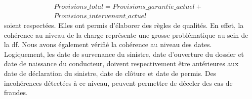  
\begin{equation}
\begin{split}  
 Provisions\_total = Provisions\_garantie\_actuel + \\
 Provisions\_intervenant\_actuel  
\end{split}
\end{equation}
soient respect\'ees. Elles ont permis d'\'elaborer des r\`egles de qualit\'es. En effet, la coh\'erence au niveau de la charge repr\'esente une grosse probl\'ematique au sein de la \acrshort{df}. Nous avons \'egalement v\'erifi\'e la coh\'erence au niveau des dates. Logiquement, les date de survenance du sinistre, date d'ouverture du dossier et date de naissance du conducteur, doivent respectivement \^etre ant\'erieures aux date de d\'eclaration du sinistre, date de clôture et date de permis. Des incoh\'erences d\'etect\'ees \`a ce niveau, peuvent permettre de d\'eceler des cas de fraudes.\\

